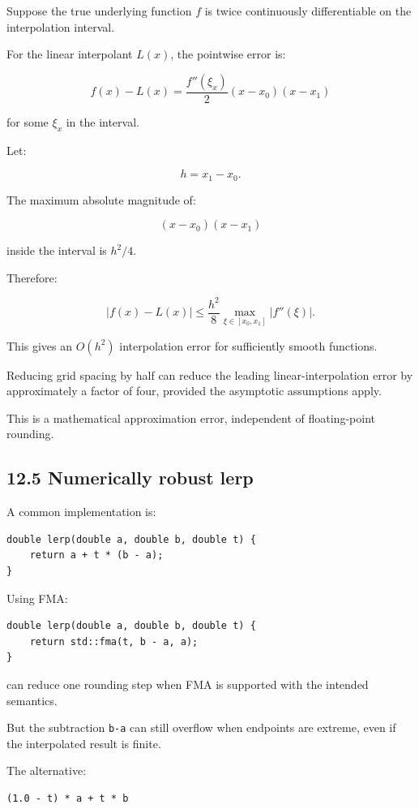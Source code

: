 Suppose the true underlying function \(f\) is twice continuously differentiable on the interpolation interval.

For the linear interpolant \(L(x)\), the pointwise error is:

\[ \boxed{ f(x)-L(x) = \frac{f''(\xi_x)}2 (x-x_0)(x-x_1) } \]

for some \(\xi_x\) in the interval.

Let:

\[ h=x_1-x_0. \]

The maximum absolute magnitude of:

\[ (x-x_0)(x-x_1) \]

inside the interval is \(h^2/4\).

Therefore:

\[ \boxed{ |f(x)-L(x)| \le \frac{h^2}{8} \max_{\xi\in[x_0,x_1]}|f''(\xi)| }. \]

This gives an \(O(h^2)\) interpolation error for sufficiently smooth functions.

Reducing grid spacing by half can reduce the leading linear-interpolation error by approximately a factor of four, provided the asymptotic assumptions apply.

This is a mathematical approximation error, independent of floating-point rounding.

\subsection{12.5 Numerically robust lerp}\label{02-foundations-ii-ch028-numerically-robust-lerp}

A common implementation is:

\begin{verbatim}
double lerp(double a, double b, double t) {
    return a + t * (b - a);
}
\end{verbatim}

Using FMA:

\begin{verbatim}
double lerp(double a, double b, double t) {
    return std::fma(t, b - a, a);
}
\end{verbatim}

can reduce one rounding step when FMA is supported with the intended semantics.

But the subtraction \texttt{b-a} can still overflow when endpoints are extreme, even if the interpolated result is finite.

The alternative:

\begin{verbatim}
(1.0 - t) * a + t * b
\end{verbatim}

